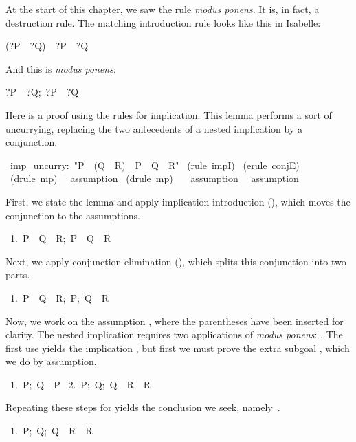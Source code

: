 At the start of this chapter, we saw the rule \textit{modus ponens}.  It is, in fact,
a destruction rule. The matching introduction rule looks like this 
in Isabelle: 
\begin{isabelle}
(?P\ \isasymLongrightarrow\ ?Q)\ \isasymLongrightarrow\ ?P\
\isasymlongrightarrow\ ?Q
\end{isabelle}
And this is \textit{modus ponens}:
\begin{isabelle}
\isasymlbrakk?P\ \isasymlongrightarrow\ ?Q;\ ?P\isasymrbrakk\
\isasymLongrightarrow\ ?Q
\rulename{mp}
\end{isabelle}

Here is a proof using the rules for implication.  This 
lemma performs a sort of uncurrying, replacing the two antecedents 
of a nested implication by a conjunction. 
\begin{isabelle}
\ imp_uncurry:\
"P\ \isasymlongrightarrow\ (Q\
\isasymlongrightarrow\ R)\ \isasymLongrightarrow\ P\
\isasymand\ Q\ \isasymlongrightarrow\
R"\isanewline
{}\ (rule\ impI)\isanewline
\isacommand{apply}\ (erule\ conjE)\isanewline
\isacommand{apply}\ (drule\ mp)\isanewline
\ \isacommand{apply}\ assumption\isanewline
{}\ (drule\ mp)\isanewline
\ \ \isacommand{apply}\ assumption\isanewline
\ \isacommand{apply}\ assumption
\end{isabelle}
First, we state the lemma and apply implication introduction (), 
which moves the conjunction to the assumptions. 
\begin{isabelle}
\ 1.\ {\isasymlbrakk}P\ \isasymlongrightarrow\ Q\ \isasymlongrightarrow\ R;\ P\ \isasymand\ Q\isasymrbrakk\ \isasymLongrightarrow\ R
\end{isabelle}
Next, we apply conjunction elimination (), which splits this
conjunction into two  parts. 
\begin{isabelle}
\ 1.\ {\isasymlbrakk}P\ \isasymlongrightarrow\ Q\ \isasymlongrightarrow\ R;\ P;\
Q\isasymrbrakk\ \isasymLongrightarrow\ R
\end{isabelle}
Now, we work on the assumption , where the parentheses have been inserted for
clarity.  The nested implication requires two applications of
\textit{modus ponens}: .  The first use  yields the
implication , but first we must prove the extra subgoal 
\isa{P}, which we do by assumption. 
\begin{isabelle}
\ 1.\ {\isasymlbrakk}P;\ Q\isasymrbrakk\ \isasymLongrightarrow\ P\isanewline
\ 2.\ {\isasymlbrakk}P;\ Q;\ Q\ \isasymlongrightarrow\ R\isasymrbrakk\ \isasymLongrightarrow\ R
\end{isabelle}
Repeating these steps for \isa{Q\
\isasymlongrightarrow\ R} yields the conclusion we seek, namely~.
\begin{isabelle}
\ 1.\ {\isasymlbrakk}P;\ Q;\ Q\ \isasymlongrightarrow\ R\isasymrbrakk\
\isasymLongrightarrow\ R
\end{isabelle}

